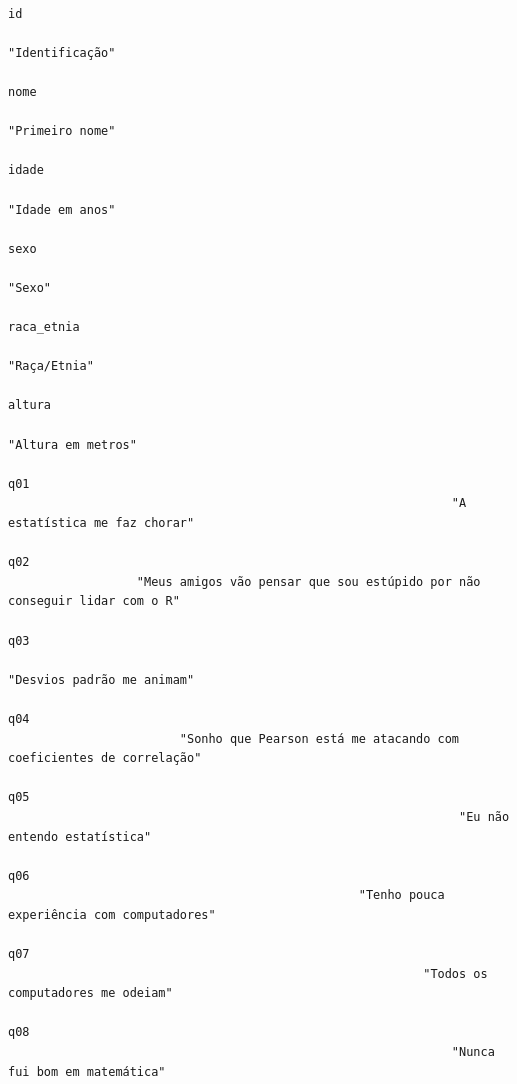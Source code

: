 \documentclass[
  letterpaper,
  DIV=11,
  numbers=noendperiod]{scrartcl}
\begin{document}
\begin{verbatim}
                                                                                         id 
                                                                            "Identificação" 
                                                                                       nome 
                                                                            "Primeiro nome" 
                                                                                      idade 
                                                                            "Idade em anos" 
                                                                                       sexo 
                                                                                     "Sexo" 
                                                                                 raca_etnia 
                                                                               "Raça/Etnia" 
                                                                                     altura 
                                                                         "Altura em metros" 
                                                                                        q01 
                                                              "A estatística me faz chorar" 
                                                                                        q02 
                  "Meus amigos vão pensar que sou estúpido por não conseguir lidar com o R" 
                                                                                        q03 
                                                                 "Desvios padrão me animam" 
                                                                                        q04 
                        "Sonho que Pearson está me atacando com coeficientes de correlação" 
                                                                                        q05 
                                                               "Eu não entendo estatística" 
                                                                                        q06 
                                                 "Tenho pouca experiência com computadores" 
                                                                                        q07 
                                                          "Todos os computadores me odeiam" 
                                                                                        q08 
                                                              "Nunca fui bom em matemática" 

\end{verbatim}
\end{document}
